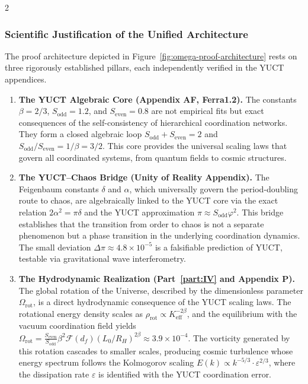 \documentclass[12pt,a4paper]{article}
\begin{document}
	\begin{multicols}{2}
		\subsubsection*{Scientific Justification of the Unified Architecture}
		
		The proof architecture depicted in Figure~\ref{fig:omega-proof-architecture} rests on three rigorously established pillars, each independently verified in the YUCT appendices.
		
		\begin{enumerate}
			\item \textbf{The YUCT Algebraic Core (Appendix AF, Ferra1.2).} The constants \(\beta = 2/3\), \(S_{\mathrm{odd}}=1.2\), and \(S_{\mathrm{even}}=0.8\) are not empirical fits but exact consequences of the self-consistency of hierarchical coordination networks. They form a closed algebraic loop \(S_{\mathrm{odd}}+S_{\mathrm{even}}=2\) and \(S_{\mathrm{odd}}/S_{\mathrm{even}} = 1/\beta = 3/2\). This core provides the universal scaling laws that govern all coordinated systems, from quantum fields to cosmic structures.
			
			\item \textbf{The YUCT–Chaos Bridge (Unity of Reality Appendix).} The Feigenbaum constants \(\delta\) and \(\alpha\), which universally govern the period-doubling route to chaos, are algebraically linked to the YUCT core via the exact relation \(2\alpha^2 = \pi\delta\) and the YUCT approximation \(\pi \approx S_{\mathrm{odd}}\varphi^2\). This bridge establishes that the transition from order to chaos is not a separate phenomenon but a phase transition in the underlying coordination dynamics. The small deviation \(\Delta\pi \approx 4.8\times10^{-5}\) is a falsifiable prediction of YUCT, testable via gravitational wave interferometry.
			
			\item \textbf{The Hydrodynamic Realization (Part~\ref{part:IV} and Appendix P).} The global rotation of the Universe, described by the dimensionless parameter \(\Omega_{\mathrm{rot}}\), is a direct hydrodynamic consequence of the YUCT scaling laws. The rotational energy density scales as \(\rho_{\mathrm{rot}} \propto K_{\mathrm{eff}}^{-2\beta}\), and the equilibrium with the vacuum coordination field yields \(\Omega_{\mathrm{rot}} = \frac{S_{\mathrm{even}}}{S_{\mathrm{odd}}} \beta^2 \mathcal{F}(d_f) (L_0/R_H)^{2\beta} \approx 3.9\times10^{-4}\). The vorticity generated by this rotation cascades to smaller scales, producing cosmic turbulence whose energy spectrum follows the Kolmogorov scaling \(E(k) \propto k^{-5/3} \cdot \varepsilon^{2/3}\), where the dissipation rate \(\varepsilon\) is identified with the YUCT coordination error.
		\end{enumerate}
		

\end{multicols}
\end{document}
